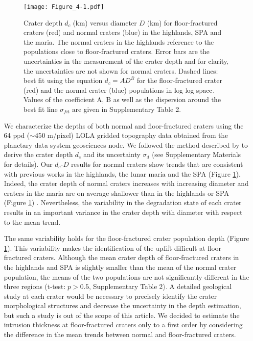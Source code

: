 \begin{figure}[pb]
    \graphicspath{ {/Users/thorey/Documents/These/Projet/FFC/Gravi_GRAIL/Article/Papier/Proof/} }
  \begin{center}

    \texttt{[image: Figure\_4-1.pdf]}

    \caption{Crater  depth $d_c$  (km)  versus diameter  $D$ (km)  for
      floor-fractured craters  (red) and normal craters  (blue) in the
      highlands,  SPA  and  the  maria.  The  normal  craters  in  the
      highlands reference to the  populations close to floor-fractured
      craters.  Error bars are the uncertainties in the measurement of
      the  crater depth  and for  clarity, the  uncertainties are  not
      shown  for normal  craters.  Dashed  lines: best  fit using  the
      equation $d_c =  AD^B$ for the floor-fractured  crater (red) and
      the normal  crater (blue) populations in  log-log space.  Values
      of the  coefficient A, B  as well  as the dispersion  around the
      best fit  line $\sigma_{fit}$  are given in  Supplementary Table
      2.}
    \label{Figure4-1}
  \end{center}
\end{figure}


We characterize the depths of  both normal and floor-fractured craters
using  the 64  ppd ($\sim450$  m/pixel) LOLA  gridded topography  data
\citep{Zuber:2009bq}   obtained  from   the   planetary  data   system
geosciences   node.     We   followed   the   method    described   by
\citet{Kalynn:2013fg}  to  derive  the  crater  depth  $d_c$  and  its
uncertainty  $\sigma_{d}$ (see  Supplementary Materials  for details).
Our  $d_c$-$D$  results  for  normal  craters  show  trends  that  are
consistent with previous  works in the highlands, the  lunar maria and
the SPA (Figure \ref{Figure4-1}).  Indeed,  the crater depth of normal
craters increases  with increasing diameter  and craters in  the maria
are  on  average  shallower  than  in the  highlands  or  SPA  (Figure
\ref{Figure4-1})        \citep{Pike:1974ux,Pike:1980eh,Kalynn:2013fg}.
Nevertheless, the variability in the  degradation state of each crater
results in  an important  variance in the  crater depth  with diameter
with respect to the mean trend.

The same  variability holds for the  floor-fractured crater population
depth   (Figure   \ref{Figure4-1}).    This  variability   makes   the
identification   of   the    uplift   difficult   at   floor-fractured
craters. Although the mean crater  depth of floor-fractured craters in
the highlands and SPA is slightly  smaller than the mean of the normal
crater  population,  the   means  of  the  two   populations  are  not
significantly  different  in  the  three regions  (t-test:  $p>  0.5$,
Supplementary Table  2).  A detailed  geological study at  each crater
would  be necessary  to  precisely identify  the crater  morphological
structures and decrease  the uncertainty in the  depth estimation, but
such a  study is  out of  the scope  of this  article.  We  decided to
estimate the intrusion thickness at  floor-fractured craters only to a
first order by  considering the difference in the  mean trends between
normal and floor-fractured craters.

